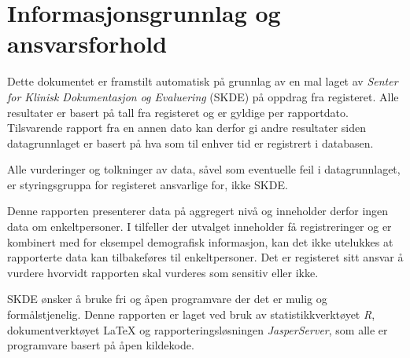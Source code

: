 %

\section{Informasjonsgrunnlag og ansvarsforhold}
Dette dokumentet er framstilt automatisk på grunnlag av en mal laget av
\textit{Senter for Klinisk Dokumentasjon og Evaluering} (SKDE) på oppdrag
fra registeret. Alle resultater
er basert på tall fra registeret og er gyldige per rapportdato. Tilsvarende
rapport fra en annen dato kan derfor gi andre resultater siden datagrunnlaget er
basert på hva som til enhver tid er registrert i databasen.
\par
Alle vurderinger og tolkninger av data, såvel som eventuelle feil i datagrunnlaget, er styringsgruppa for
registeret ansvarlige for, ikke SKDE.
\par
Denne rapporten presenterer data på aggregert nivå og inneholder derfor ingen
data om enkeltpersoner. I tilfeller der utvalget inneholder få registreringer og
er kombinert med for eksempel demografisk informasjon, kan det ikke utelukkes
at rapporterte data kan tilbakeføres til enkeltpersoner. Det er registeret sitt ansvar
å vurdere hvorvidt rapporten skal vurderes som sensitiv eller ikke.
\par
SKDE ønsker å bruke fri og åpen programvare der det er mulig og
formålstjenelig. Denne rapporten er laget ved bruk av statistikkverktøyet
\textit{R}, dokumentverktøyet \LaTeX{} og rapporteringsløsningen
\textit{JasperServer}, som alle er programvare basert på åpen kildekode.



